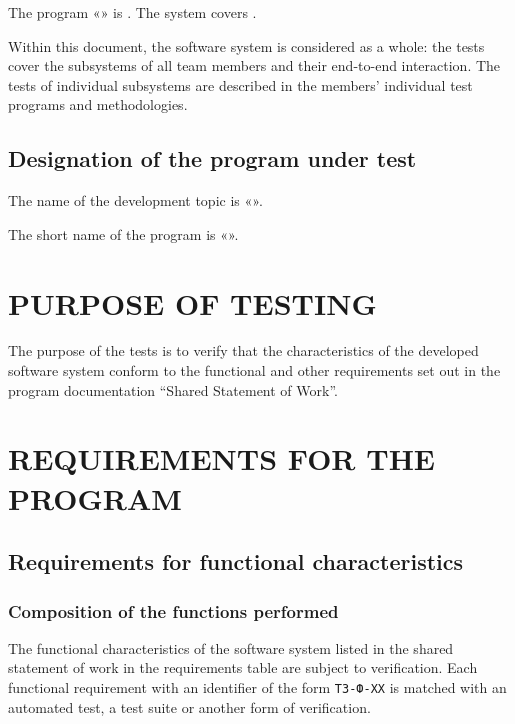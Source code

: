 \documentclass[12pt,a4paper]{extarticle}
\begin{document}
The program «\projectname» is . The system covers .

Within this document, the software system is considered as a whole: the tests cover the subsystems of all team members and their end-to-end interaction. The tests of individual subsystems are described in the members' individual test programs and methodologies.

\subsection{Designation of the program under test}

The name of the development topic is «\projectname».

The short name of the program is «\hseProjectNameShort».

\clearpage

\section{PURPOSE OF TESTING}

The purpose of the tests is to verify that the characteristics of the developed software system conform to the functional and other requirements set out in the program documentation \enquote{Shared Statement of Work}.

\clearpage

\section{REQUIREMENTS FOR THE PROGRAM}

\subsection{Requirements for functional characteristics}

\subsubsection{Composition of the functions performed}

The functional characteristics of the software system listed in the shared statement of work in the requirements table are subject to verification. Each functional requirement with an identifier of the form \texttt{ТЗ-Ф-XX} is matched with an automated test, a test suite or another form of verification.
\end{document}
